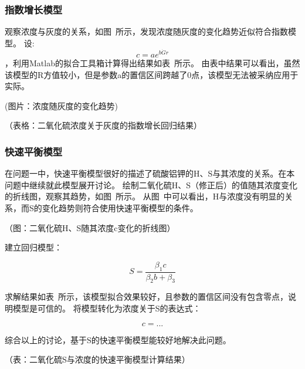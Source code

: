 \subsubsection{指数增长模型}

观察浓度与灰度的关系，如图~所示，发现浓度随灰度的变化趋势近似符合指数模型。
设: $$c=ae^{b\dot Gr}$$，利用Matlab的拟合工具箱计算得出结果如表~所示。
由表中结果可以看出，虽然该模型的R方值较小，但是参数a的置信区间跨越了0点，该模型无法被采纳应用于实际。

(图片：浓度随灰度的变化趋势)

（表格：二氧化硫浓度关于灰度的指数增长回归结果）



\subsubsection{快速平衡模型}

在问题一中，快速平衡模型很好的描述了硫酸铝钾的H、S与其浓度的关系。在本问题中继续就此模型展开讨论。
绘制二氧化硫H、S（修正后）的值随其浓度变化的折线图，观察其趋势，如图~所示。
从图~中可以看出，H与浓度没有明显的关系，而S的变化趋势则符合使用快速平衡模型的条件。

（图：二氧化硫H、S随其浓度c变化的折线图）

建立回归模型：


   $$ S = \frac{\beta_1 c}{\beta_2b+\beta_3}$$


求解结果如表~所示，该模型拟合效果较好，且参数的置信区间没有包含零点，说明模型是可信的。
将模型转化为浓度关于S的表达式：


    $$c = ...$$


综合以上的讨论，基于S的快速平衡模型能较好地解决此问题。

（表：二氧化硫S与浓度的快速平衡模型计算结果）
